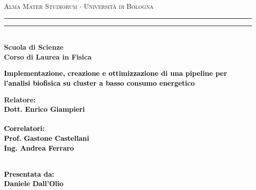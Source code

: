 \documentclass[12pt,a4paper]{report}
\begin{document}
\begin{titlepage}

%
%
%
\begin{center}
{{\Large{\textsc{Alma Mater Studiorum $\cdot$ Universit\`a di Bologna}}}}
\rule[0.1cm]{15.8cm}{0.1mm}
\rule[0.5cm]{15.8cm}{0.6mm}
\\\vspace{3mm}
%
%
{\small{\bf Scuola di Scienze \\ Corso di Laurea in Fisica}}

\end{center}

\vspace{23mm}

\begin{center}\textcolor{black}{
%
%
%
{\LARGE{\bf Implementazione, creazione e ottimizzazione di una pipeline per l'analisi biofisica su cluster a basso consumo energetico}}\\
}\end{center}

\vspace{50mm} \par \noindent

\begin{minipage}[t]{0.47\textwidth}
  {\large
    {\bf Relatore: \vspace{2mm}\\
      \textcolor{black}{
      Dott. Enrico Giampieri}\\\\

	\textcolor{black}{
	\bf Correlatori:
	\vspace{2mm}\\
	Prof. Gastone Castellani \\
	Ing. Andrea Ferraro \\\\
	}
    }
  }
\end{minipage}
%
\hfill
%
\begin{minipage}[t]{0.47\textwidth}\raggedleft \textcolor{black}{
{\large{\bf Presentata da:
\vspace{2mm}\\
Daniele Dall'Olio}}}
\end{minipage}


\end{titlepage}
\end{document}
